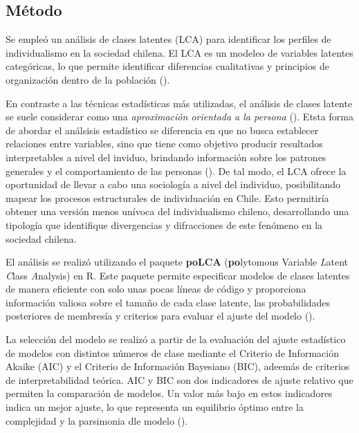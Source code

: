 \documentclass[
  letterpaper,
  DIV=11,
  numbers=noendperiod]{scrartcl}
\begin{document}
\endgroup{}

\subsection{Método}\label{muxe9todo}

Se empleó un análisis de clases latentes (LCA) para identificar los
perfiles de individualismo en la sociedad chilena. El LCA es un modeleo
de variables latentes categóricas, lo que permite identificar
diferencias cualitativas y principios de organización dentro de la
población ().

En contraste a las técnicas estadísticas más utilizadas, el análisis de
clases latente se suele considerar como una \emph{aproximación orientada
a la persona} (). Etsta
forma de abordar el análsisis estadístico se diferencia en que no busca
establecer relaciones entre variables, sino que tiene como objetivo
producir resultados interpretables a nivel del inviduo, brindando
información sobre los patrones generales y el comportamiento de las
personas (). De tal
modo, el LCA ofrece la oportunidad de llevar a cabo una sociología a
nivel del individuo, posibilitando mapear los procesos estructurales de
individuación en Chile. Esto permitiría obtener una versión menos
unívoca del individualismo chileno, desarrollando una tipología que
identifique divergencias y difracciones de este fenómeno en la sociedad
chilena.

El análisis se realizó utilizando el paquete \textbf{poLCA}
(\textbf{po}lytomous Variable \emph{L}atent \emph{C}lass
\emph{A}nalysis) en R. Este paquete permite especificar modelos de
clases latentes de manera eficiente con solo unas pocas líneas de código
y proporciona información valiosa sobre el tamaño de cada clase latente,
las probabilidades posteriores de membresía y criterios para evaluar el
ajuste del modelo ().

La selección del modelo se realizó a partir de la evaluación del ajuste
estadístico de modelos con distintos números de clase mediante el
Criterio de Información Akaike (AIC) y el Criterio de Información
Bayesiano (BIC), adeemás de criterios de interpretabilidad teórica. AIC
y BIC son dos indicadores de ajuste relativo que permiten la comparación
de modelos. Un valor más bajo en estos indicadores indica un mejor
ajuste, lo que representa un equilibrio óptimo entre la complejidad y la
parsimonia dle modelo ().
\end{document}
